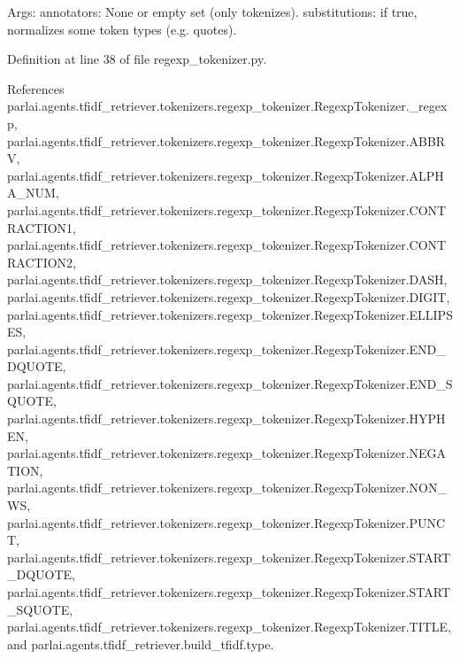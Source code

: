 \begin{DoxyVerb}Args:
    annotators: None or empty set (only tokenizes).
    substitutions: if true, normalizes some token types (e.g. quotes).
\end{DoxyVerb}
 

Definition at line 38 of file regexp\+\_\+tokenizer.\+py.



References parlai.\+agents.\+tfidf\+\_\+retriever.\+tokenizers.\+regexp\+\_\+tokenizer.\+Regexp\+Tokenizer.\+\_\+regexp, parlai.\+agents.\+tfidf\+\_\+retriever.\+tokenizers.\+regexp\+\_\+tokenizer.\+Regexp\+Tokenizer.\+A\+B\+B\+RV, parlai.\+agents.\+tfidf\+\_\+retriever.\+tokenizers.\+regexp\+\_\+tokenizer.\+Regexp\+Tokenizer.\+A\+L\+P\+H\+A\+\_\+\+N\+UM, parlai.\+agents.\+tfidf\+\_\+retriever.\+tokenizers.\+regexp\+\_\+tokenizer.\+Regexp\+Tokenizer.\+C\+O\+N\+T\+R\+A\+C\+T\+I\+O\+N1, parlai.\+agents.\+tfidf\+\_\+retriever.\+tokenizers.\+regexp\+\_\+tokenizer.\+Regexp\+Tokenizer.\+C\+O\+N\+T\+R\+A\+C\+T\+I\+O\+N2, parlai.\+agents.\+tfidf\+\_\+retriever.\+tokenizers.\+regexp\+\_\+tokenizer.\+Regexp\+Tokenizer.\+D\+A\+SH, parlai.\+agents.\+tfidf\+\_\+retriever.\+tokenizers.\+regexp\+\_\+tokenizer.\+Regexp\+Tokenizer.\+D\+I\+G\+IT, parlai.\+agents.\+tfidf\+\_\+retriever.\+tokenizers.\+regexp\+\_\+tokenizer.\+Regexp\+Tokenizer.\+E\+L\+L\+I\+P\+S\+ES, parlai.\+agents.\+tfidf\+\_\+retriever.\+tokenizers.\+regexp\+\_\+tokenizer.\+Regexp\+Tokenizer.\+E\+N\+D\+\_\+\+D\+Q\+U\+O\+TE, parlai.\+agents.\+tfidf\+\_\+retriever.\+tokenizers.\+regexp\+\_\+tokenizer.\+Regexp\+Tokenizer.\+E\+N\+D\+\_\+\+S\+Q\+U\+O\+TE, parlai.\+agents.\+tfidf\+\_\+retriever.\+tokenizers.\+regexp\+\_\+tokenizer.\+Regexp\+Tokenizer.\+H\+Y\+P\+H\+EN, parlai.\+agents.\+tfidf\+\_\+retriever.\+tokenizers.\+regexp\+\_\+tokenizer.\+Regexp\+Tokenizer.\+N\+E\+G\+A\+T\+I\+ON, parlai.\+agents.\+tfidf\+\_\+retriever.\+tokenizers.\+regexp\+\_\+tokenizer.\+Regexp\+Tokenizer.\+N\+O\+N\+\_\+\+WS, parlai.\+agents.\+tfidf\+\_\+retriever.\+tokenizers.\+regexp\+\_\+tokenizer.\+Regexp\+Tokenizer.\+P\+U\+N\+CT, parlai.\+agents.\+tfidf\+\_\+retriever.\+tokenizers.\+regexp\+\_\+tokenizer.\+Regexp\+Tokenizer.\+S\+T\+A\+R\+T\+\_\+\+D\+Q\+U\+O\+TE, parlai.\+agents.\+tfidf\+\_\+retriever.\+tokenizers.\+regexp\+\_\+tokenizer.\+Regexp\+Tokenizer.\+S\+T\+A\+R\+T\+\_\+\+S\+Q\+U\+O\+TE, parlai.\+agents.\+tfidf\+\_\+retriever.\+tokenizers.\+regexp\+\_\+tokenizer.\+Regexp\+Tokenizer.\+T\+I\+T\+LE, and parlai.\+agents.\+tfidf\+\_\+retriever.\+build\+\_\+tfidf.\+type.



